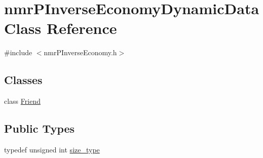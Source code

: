 \hypertarget{classnmr_p_inverse_economy_dynamic_data}{}\section{nmr\+P\+Inverse\+Economy\+Dynamic\+Data Class Reference}
\label{classnmr_p_inverse_economy_dynamic_data}


{\ttfamily \#include $<$nmr\+P\+Inverse\+Economy.\+h$>$}

\subsection*{Classes}
\begin{DoxyCompactItemize}
\item 
class \hyperlink{classnmr_p_inverse_economy_dynamic_data_1_1_friend}{Friend}
\end{DoxyCompactItemize}
\subsection*{Public Types}
\begin{DoxyCompactItemize}
\item 
typedef unsigned int \hyperlink{classnmr_p_inverse_economy_dynamic_data_a32ab8d601abf927292b49d0cea124f9b}{size\+\_\+type}
\end{DoxyCompactItemize}
